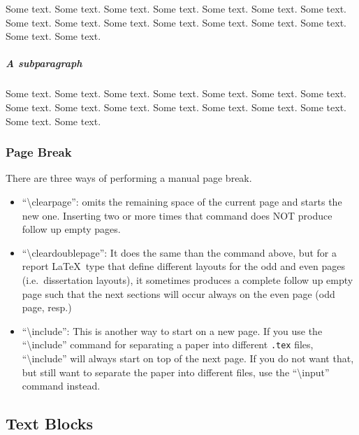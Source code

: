 Some text. Some text. Some text. Some text. Some text. Some text. Some
text. Some text. Some text. Some text. Some text. Some text. Some
text. Some text. Some text. Some text.

\subparagraph{A subparagraph}

Some text. Some text. Some text. Some text. Some text. Some text. Some
text. Some text. Some text. Some text. Some text. Some text. Some
text. Some text. Some text. Some text.

\subsubsection{Page Break}

There are three ways of performing a manual page break.
\begin{itemize}
  \item ``\textbackslash{}clearpage'': omits the remaining space of the
current page and starts the new one. Inserting two or more times that
command does NOT produce follow up empty pages.
  \item ``\textbackslash{}cleardoublepage'': It does the same than the
command above, but for a report \LaTeX\ type that define different
layouts for the odd and even pages (i.e.\ dissertation layouts), it
sometimes produces a complete follow up empty page such that the next
sections will occur always on the even page (odd page, resp.)
  \item ``\textbackslash{}include'': This is another way to start on a
new page. If you use the ``\textbackslash{}include''
command for separating a paper
into different \texttt{.tex} files,
``\textbackslash{}include'' will always start on
top of the next page. If you do not want that, but still want to
separate the paper into different files,
use the ``\textbackslash{}input''
command instead.
\end{itemize}

\clearpage

\cleardoublepage

\subsection{Text Blocks}

